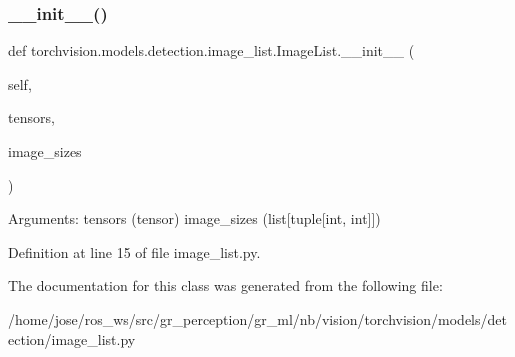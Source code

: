 \subsubsection{\texorpdfstring{\+\_\+\+\_\+init\+\_\+\+\_\+()}{\_\_init\_\_()}}
{\footnotesize\ttfamily def torchvision.\+models.\+detection.\+image\+\_\+list.\+Image\+List.\+\_\+\+\_\+init\+\_\+\+\_\+ (\begin{DoxyParamCaption}\item[{}]{self,  }\item[{}]{tensors,  }\item[{}]{image\+\_\+sizes }\end{DoxyParamCaption})}

\begin{DoxyVerb}Arguments:
    tensors (tensor)
    image_sizes (list[tuple[int, int]])
\end{DoxyVerb}
 

Definition at line 15 of file image\+\_\+list.\+py.



The documentation for this class was generated from the following file\+:\begin{DoxyCompactItemize}
\item 
/home/jose/ros\+\_\+ws/src/gr\+\_\+perception/gr\+\_\+ml/nb/vision/torchvision/models/detection/image\+\_\+list.\+py\end{DoxyCompactItemize}
